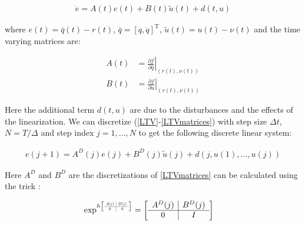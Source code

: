 \documentclass[10pt,a4paper]{article}
\newcommand\at[2]{\left.#1\right|_{#2}} %
\newcommand\scalemath[2]{\scalebox{#1}{\mbox{\ensuremath{\displaystyle #2}}}} %
\newcommand{\joint}{q} %
\newcommand{\state}{\bar{\joint}} %
\newcommand{\error}{e} %
\newcommand{\traj}{r} %
\newcommand{\linDist}{d} %
\newcommand{\sysInput}{u} %
\newcommand{\linInput}{\tilde{u}} %
\newcommand{\trjInput}{\nu} %
\newcommand{\dynamics}{f}
\begin{document}
\begin{equation}
\begin{aligned}
\dot{\error} = A(t)\error(t) + B(t)\linInput(t) + \linDist(t,\sysInput)
\end{aligned}
\label{LTV}
\end{equation}

where $\error(t) = \state(t) - \traj(t)$, $\state = [\joint,\dot{\joint}]^{\mathrm{T}}$, $\linInput(t) = \sysInput(t) - \trjInput(t)$ and the time varying matrices are:

\begin{equation}
\begin{aligned}
A(t) &= \at{\frac{\partial{\dynamics}}{\partial{\state}}}{(\traj(t),\trjInput(t))} \\
B(t) &= \at{\frac{\partial{\dynamics}}{\partial{\sysInput}}}{(\traj(t),\trjInput(t))}
\end{aligned}
\label{LTVmatrices}
\end{equation}

Here the additional term $\linDist(t,\sysInput)$ are due to the disturbances and the effects of the linearization. We can discretize (\ref{LTV}-\ref{LTVmatrices}) with step size $\Delta t$, $N = T/\Delta$ and step index $j = 1, \ldots, N$ to get the following discrete linear system:

\begin{equation}
\begin{aligned}
\error(j+1) = A^{D}(j)\error(j) + B^{D}(j)\linInput(j) + \linDist(j, \sysInput(1), \ldots, \sysInput(j))
\end{aligned}
\label{discreteLTV}
\end{equation}

Here $A^D$ and $B^D$ are the discretizations of \eqref{LTVmatrices} can be calculated using the trick \cite{Schoellig12}:

\begin{equation}
\begin{aligned}
\exp^{h
\left[
\scalemath{0.5}{
\begin{array}{c|c}
A(j) & B(j) \\ \hline
0 & 0
\end{array}}\right]}
&= 
\left[
\begin{array}{c|c}
A^{D}(j) & B^{D}(j) \\ \hline
0 & I
\end{array}\right] 
\end{aligned}
\label{discreteMatrices}
\end{equation}
\end{document}
